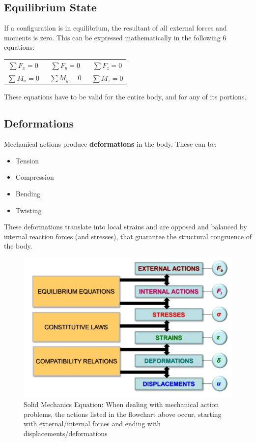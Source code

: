 \documentclass[class=report, crop=false, 12pt,a4paper]{standalone}
\begin{document}
\subsection{Equilibrium State}
If a configuration is in equilibrium, the resultant of all external forces and moments is zero. This can be expressed mathematically in the following 6 equations:
\begin{center}
  \begin{tabular}{ c c c } 
   $\sum F_x = 0$ & \ $\sum F_y = 0$ & \ $\sum F_z = 0$ \\
   $\sum M_x = 0$ & \ $\sum M_y = 0$ & \ $\sum M_z = 0$
  \end{tabular}
\end{center}
These equations have to be valid for the entire body, and for any of its portions.
\subsection{Deformations}
Mechanical actions produce \textbf{deformations} in the body. These can be:
\begin{itemize}[noitemsep]
  \item Tension
  \item Compression
  \item Bending
  \item Twisting
\end{itemize}
These deformations translate into local strains and are opposed and balanced by internal reaction forces (and stresses), that guarantee the structural congruence of the body.
\begin{figure}[H]
  \centering
  \includegraphics[width = 0.6 \textwidth]{../img/solidmechanicsequation.PNG}
  \caption{Solid Mechanics Equation: When dealing with mechanical action problems, the actions listed in the flowchart above occur, starting with external/internal forces and ending with displacements/deformations}
\end{figure}
\end{document}
